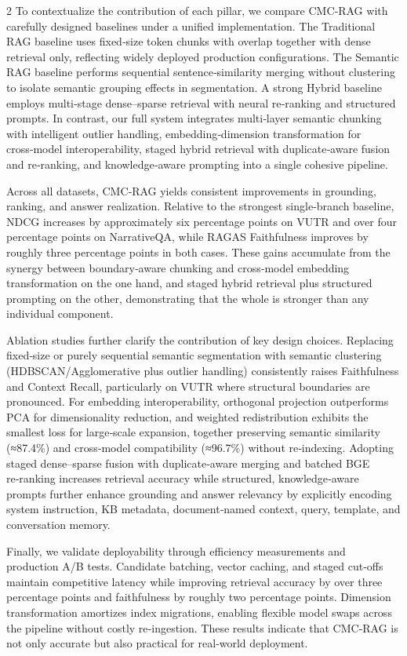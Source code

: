 \documentclass[10pt,letterpaper]{article}
\begin{document}
\begin{multicols}{2}
To contextualize the contribution of each pillar, we compare CMC‑RAG with carefully designed baselines under a unified implementation. The Traditional RAG baseline uses fixed‑size token chunks with overlap together with dense retrieval only, reflecting widely deployed production configurations. The Semantic RAG baseline performs sequential sentence‑similarity merging without clustering to isolate semantic grouping effects in segmentation. A strong Hybrid baseline employs multi‑stage dense–sparse retrieval with neural re‑ranking and structured prompts. In contrast, our full system integrates multi‑layer semantic chunking with intelligent outlier handling, embedding‑dimension transformation for cross‑model interoperability, staged hybrid retrieval with duplicate‑aware fusion and re‑ranking, and knowledge‑aware prompting into a single cohesive pipeline.

Across all datasets, CMC‑RAG yields consistent improvements in grounding, ranking, and answer realization. Relative to the strongest single‑branch baseline, NDCG increases by approximately six percentage points on VUTR and over four percentage points on NarrativeQA, while RAGAS Faithfulness improves by roughly three percentage points in both cases. These gains accumulate from the synergy between boundary‑aware chunking and cross‑model embedding transformation on the one hand, and staged hybrid retrieval plus structured prompting on the other, demonstrating that the whole is stronger than any individual component.

Ablation studies further clarify the contribution of key design choices. Replacing fixed‑size or purely sequential semantic segmentation with semantic clustering (HDBSCAN/Agglomerative plus outlier handling) consistently raises Faithfulness and Context Recall, particularly on VUTR where structural boundaries are pronounced. For embedding interoperability, orthogonal projection outperforms PCA for dimensionality reduction, and weighted redistribution exhibits the smallest loss for large‑scale expansion, together preserving semantic similarity (≈87.4\%) and cross‑model compatibility (≈96.7\%) without re‑indexing. Adopting staged dense–sparse fusion with duplicate‑aware merging and batched BGE re‑ranking increases retrieval accuracy while structured, knowledge‑aware prompts further enhance grounding and answer relevancy by explicitly encoding system instruction, KB metadata, document‑named context, query, template, and conversation memory.

Finally, we validate deployability through efficiency measurements and production A/B tests. Candidate batching, vector caching, and staged cut‑offs maintain competitive latency while improving retrieval accuracy by over three percentage points and faithfulness by roughly two percentage points. Dimension transformation amortizes index migrations, enabling flexible model swaps across the pipeline without costly re‑ingestion. These results indicate that CMC‑RAG is not only accurate but also practical for real‑world deployment.


\end{multicols}
\end{document}
